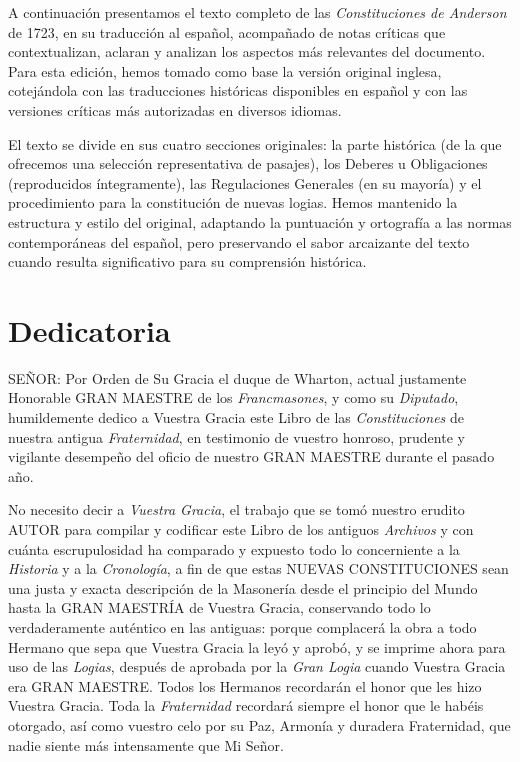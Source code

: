 \documentclass[a4paper,12pt,twoside]{book}
\newcommand{\manuscritosection}[1]{%
\section*{#1}
\addcontentsline{toc}{section}{#1}
}
\begin{document}
\lettrine[lines=3, lhang=0.1, loversize=0.1]{\textcolor{borgoña}{A}}{} continuación presentamos el texto completo de las \textit{Constituciones de Anderson} de 1723, en su traducción al español, acompañado de notas críticas que contextualizan, aclaran y analizan los aspectos más relevantes del documento. Para esta edición, hemos tomado como base la versión original inglesa, cotejándola con las traducciones históricas disponibles en español y con las versiones críticas más autorizadas en diversos idiomas.

El texto se divide en sus cuatro secciones originales: la parte histórica (de la que ofrecemos una selección representativa de pasajes), los Deberes u Obligaciones (reproducidos íntegramente), las Regulaciones Generales (en su mayoría) y el procedimiento para la constitución de nuevas logias. Hemos mantenido la estructura y estilo del original, adaptando la puntuación y ortografía a las normas contemporáneas del español, pero preservando el sabor arcaizante del texto cuando resulta significativo para su comprensión histórica.

\manuscritosection{Dedicatoria}

\lettrine[lines=3, lhang=0.1, loversize=0.1]{\textcolor{dorado}{S}}{EÑOR:} Por Orden de Su Gracia el duque de Wharton, actual justamente Honorable GRAN MAESTRE de los \textit{Francmasones}, y como su \textit{Diputado}, humildemente dedico a Vuestra Gracia este Libro de las \textit{Constituciones} de nuestra antigua \textit{Fraternidad}, en testimonio de vuestro honroso, prudente y vigilante desempeño del oficio de nuestro GRAN MAESTRE durante el pasado año.

No necesito decir a \textit{Vuestra Gracia}, el trabajo que se tomó nuestro erudito AUTOR para compilar y codificar este Libro de los antiguos \textit{Archivos} y con cuánta escrupulosidad ha comparado y expuesto todo lo concerniente a la \textit{Historia} y a la \textit{Cronología}, a fin de que estas NUEVAS CONSTITUCIONES sean una justa y exacta descripción de la Masonería desde el principio del Mundo hasta la GRAN MAESTRÍA de Vuestra Gracia, conservando todo lo verdaderamente auténtico en las antiguas: porque complacerá la obra a todo Hermano que sepa que Vuestra Gracia la leyó y aprobó, y se imprime ahora para uso de las \textit{Logias}, después de aprobada por la \textit{Gran Logia} cuando Vuestra Gracia era GRAN MAESTRE. Todos los Hermanos recordarán el honor que les hizo Vuestra Gracia. Toda la \textit{Fraternidad} recordará siempre el honor que le habéis otorgado, así como vuestro celo por su Paz, Armonía y duradera Fraternidad, que nadie siente más intensamente que Mi Señor.
\end{document}

